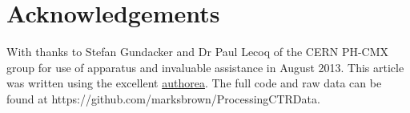 \section*{Acknowledgements}
With thanks to Stefan Gundacker and Dr Paul Lecoq of the CERN PH-CMX group for use of apparatus and invaluable assistance in August 2013. This article was written using the excellent \href{www.authorea.com}{authorea}. The full code and raw data can be found at https://github.com/marksbrown/ProcessingCTRData.